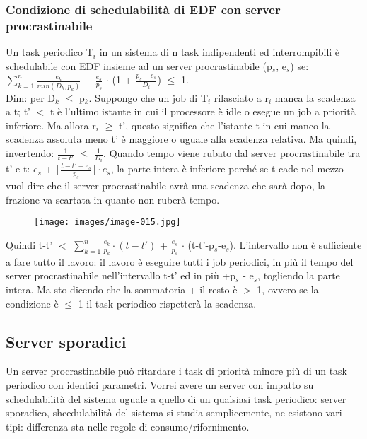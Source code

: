\documentclass[12pt, oneside]{extbook}
\begin{document}
\subsubsection{Condizione di schedulabilità di EDF con server procrastinabile}
Un task periodico T$_{i}$ in un sistema di n task indipendenti ed interrompibili è schedulabile con EDF insieme ad un server procrastinabile (p$_{s}$, e$_{s}$) se:\\ $\sum\limits_{k = 1}^{n} \frac{e_k}{min(D_k, p_k)}$ + $\frac{e_s}{p_s}$ $\cdot$ (1 + $\frac{p_s - e_s}{D_i}$) $\leq$ 1.\\ Dim: per D$_{k}$ $\leq$ p$_{k}$. Suppongo che un job di T$_{i}$ rilasciato a r$_{i}$ manca la scadenza a t; t' $<$ t è l'ultimo istante in cui il processore è idle o esegue un job a priorità inferiore. Ma allora r$_{i}$ $\geq$ t', questo significa che l'istante t in cui manco la scadenza assoluta meno t' è maggiore o uguale alla scadenza relativa. Ma quindi, invertendo: $\frac{1}{t-t'}$ $\leq$ $\frac{1}{D_i}$. Quando tempo viene rubato dal server procrastinabile tra t' e t: $e_{s}$ + $\lfloor \frac{t - t'- e_s}{p_s}\rfloor \cdot e_s$, la parte intera è inferiore perché se t cade nel mezzo vuol dire che il server procrastinabile avrà una scadenza che sarà dopo, la frazione va scartata in quanto non ruberà tempo.\\
\begin{figure}[!h]
\centering
\texttt{[image: images/image-015.jpg]}
\end{figure}
Quindi t-t' $<$ $\sum\limits_{k=1}^{n} \frac{e_k}{p_k} \cdot (t-t')$ + $\frac{e_s}{p_s}$ $\cdot$ (t-t'-p$_s$-e$_{s}$). L'intervallo non è sufficiente a fare tutto il lavoro: il lavoro è eseguire tutti i job periodici, in più il tempo del server procrastinabile nell'intervallo t-t' ed in più +p$_{s}$ - e$_{s}$, togliendo la parte intera. Ma sto dicendo che la sommatoria + il resto è $>$ 1, ovvero se la condizione è $\leq$ 1 il task periodico rispetterà la scadenza.
\subsection{Server sporadici}
Un server procrastinabile può ritardare i task di priorità minore più di un task periodico con identici parametri. Vorrei avere un server con impatto su schedulabilità del sistema uguale a quello di un qualsiasi task periodico: server sporadico, shcedulabilità del sistema si studia semplicemente, ne esistono vari tipi: differenza sta nelle regole di consumo/rifornimento.
\end{document}
